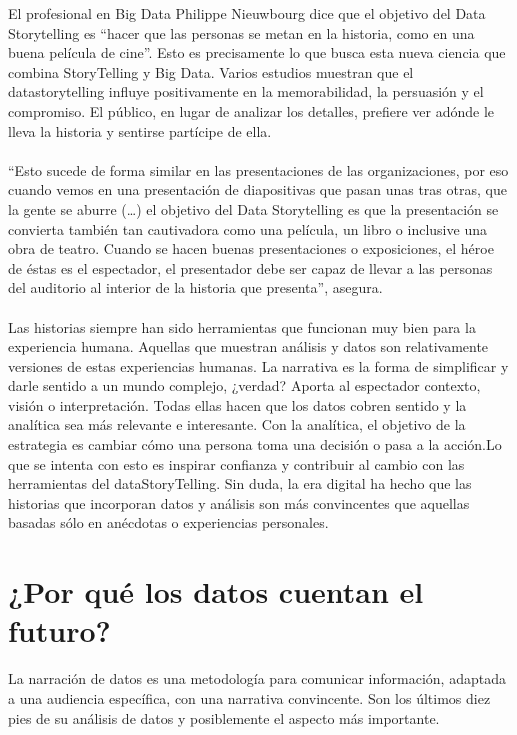 {{\item{El profesional en Big Data Philippe Nieuwbourg dice que el objetivo del Data Storytelling es “hacer que las personas se metan en la historia, como en una buena película de cine”. Esto es precisamente lo que busca esta nueva ciencia que combina StoryTelling y Big Data. Varios estudios muestran que el datastorytelling influye positivamente en la memorabilidad, la persuasión y el compromiso. El público, en lugar de analizar los detalles, prefiere ver adónde le lleva la historia y sentirse partícipe de ella.
\\\\“Esto sucede de forma similar en las presentaciones de las organizaciones, por eso cuando vemos en una presentación de diapositivas que pasan unas tras otras, que la gente se aburre (…) el objetivo del Data Storytelling es que la presentación se convierta también tan cautivadora como una película, un libro o inclusive una obra de teatro. Cuando se hacen buenas presentaciones o exposiciones, el héroe de éstas es el espectador, el presentador debe ser capaz de llevar a las personas del auditorio al interior de la historia que presenta”, asegura.
\\\\Las historias siempre han sido herramientas que funcionan muy bien para la experiencia humana. Aquellas que muestran análisis y datos son relativamente versiones de estas experiencias humanas. La narrativa es la forma de simplificar y darle sentido a un mundo complejo, ¿verdad? Aporta al espectador contexto, visión o interpretación. Todas ellas hacen que los datos cobren sentido y la analítica sea más relevante e interesante. Con la analítica, el objetivo de la estrategia es cambiar cómo una persona toma una decisión o pasa a la acción.Lo que se intenta con esto es inspirar confianza y contribuir al cambio con las herramientas del dataStoryTelling. Sin duda, la era digital ha hecho que las historias que incorporan datos y análisis son más convincentes que aquellas basadas sólo en anécdotas o experiencias personales.
}

\section{¿Por qué los datos cuentan el futuro?}

\item{La narración de datos es una metodología para comunicar información, adaptada a una audiencia específica, con una narrativa convincente. Son los últimos diez pies de su análisis de datos y posiblemente el aspecto más importante.

}}}
